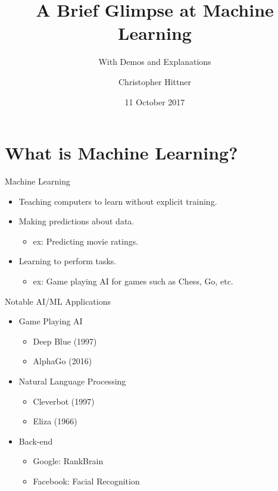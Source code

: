 \documentclass[11pt]{beamer}
\title{A Brief Glimpse at Machine Learning}
\subtitle{With Demos and Explanations}
\author{Christopher Hittner}
\date{11 October 2017}
\begin{document}
\maketitle

\section{What is Machine Learning?}

\begin{frame}{Machine Learning}
\begin{itemize}
    \item Teaching computers to learn without explicit training.
    \item Making predictions about data.
    \begin{itemize}
        \item ex: Predicting movie ratings.
    \end{itemize}
    \item Learning to perform tasks.
    \begin{itemize}
        \item ex: Game playing AI for games such as Chess, Go, etc.
    \end{itemize}
\end{itemize}
\end{frame}

\begin{frame}{Notable AI/ML Applications}
\begin{itemize}
    \item Game Playing AI
    \begin{itemize}
        \item Deep Blue (1997)
        \item AlphaGo (2016)
    \end{itemize}
    \item Natural Language Processing
    \begin{itemize}
        \item Cleverbot (1997)
        \item Eliza (1966)
    \end{itemize}
    \item Back-end
    \begin{itemize}
        \item Google: RankBrain
        \item Facebook: Facial Recognition
    \end{itemize}
\end{itemize}
\end{frame}
\end{document}
